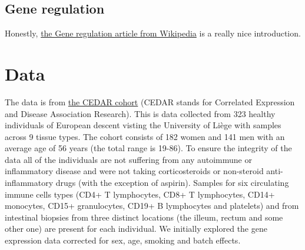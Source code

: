 \documentclass[a4paper,10pt]{article}
\begin{document}
\subsection{Gene regulation}
Honestly, \href{https://www.wikiwand.com/en/Regulation_of_gene_expression#/Examples_of_gene_regulation}
{the Gene regulation article from Wikipedia} is a really nice introduction.

\section{Data}
The data is from \href{http://139.165.108.18/srv/genmol/permanent/1be6993fe41c12a051c9244d67c91da2be49e5dd26a6cd79f442bc006971e2ef/crohn-index.html}
{the CEDAR cohort} (CEDAR stands for Correlated Expression and Disease Association Research). This is 
data collected from 323 healthy individuals of European descent visting the University of Li\`ege with 
samples across 9 tissue types. The cohort consists of 182 women and 141 men with an average age of 56 
years (the total range is 19-86). To ensure the integrity of the data all of the individuals are not 
suffering from any autoimmune or inflammatory disease and were not taking corticosteroids or non-steroid 
anti-inflammatory drugs (with the exception of aspirin). Samples for six circulating immune cells types
(CD4+ T lymphocytes, CD8+ T lymphocytes, CD14+ monocytes, CD15+ granulocytes, CD19+ B lymphocytes and 
platelets) and from intestinal biopsies from three distinct locations (the illeum, rectum and 
some other one) are present for each individual. We initially explored the gene expression data 
corrected for sex, age, smoking and batch effects.



\end{document}
